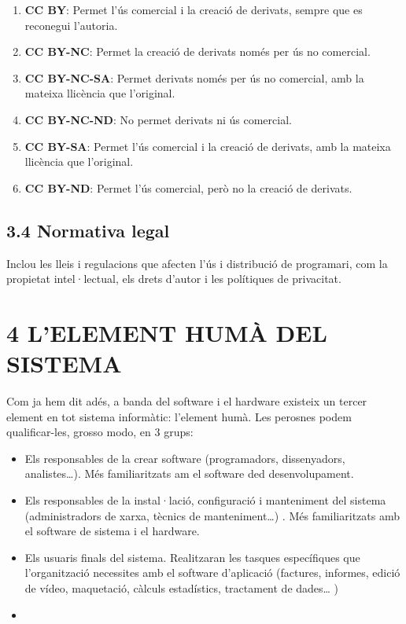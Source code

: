 \documentclass[
  12 pt,
  a4paper,
]{article}
\providecommand{\tightlist}{%
  \setlength{\itemsep}{0pt}\setlength{\parskip}{0pt}}
\begin{document}
\begin{enumerate}
\def\labelenumi{\arabic{enumi}.}
\tightlist
\item
  \textbf{CC BY}: Permet l'ús comercial i la creació de derivats, sempre
  que es reconegui l'autoria.
\item
  \textbf{CC BY-NC}: Permet la creació de derivats només per ús no
  comercial.
\item
  \textbf{CC BY-NC-SA}: Permet derivats només per ús no comercial, amb
  la mateixa llicència que l'original.
\item
  \textbf{CC BY-NC-ND}: No permet derivats ni ús comercial.
\item
  \textbf{CC BY-SA}: Permet l'ús comercial i la creació de derivats, amb
  la mateixa llicència que l'original.
\item
  \textbf{CC BY-ND}: Permet l'ús comercial, però no la creació de
  derivats.
\end{enumerate}

\subsection{3.4 Normativa legal}\label{normativa-legal}

Inclou les lleis i regulacions que afecten l'ús i distribució de
programari, com la propietat intel·lectual, els drets d'autor i les
polítiques de privacitat.

\section{4 L'ELEMENT HUMÀ DEL
SISTEMA}\label{lelement-humuxe0-del-sistema}

Com ja hem dit adés, a banda del software i el hardware existeix un
tercer element en tot sistema informàtic: l'element humà. Les perosnes
podem qualificar-les, grosso modo, en 3 grups:

\begin{itemize}
\item
  Els responsables de la crear software (programadors, dissenyadors,
  analistes\ldots). Més familiaritzats am el software ded
  desenvolupament.
\item
  Els responsables de la instal·lació, configuració i manteniment del
  sistema (administradors de xarxa, tècnics de manteniment\ldots) . Més
  familiaritzats amb el software de sistema i el hardware.
\item
  Els usuaris finals del sistema. Realitzaran les tasques específiques
  que l'organització necessites amb el software d'aplicació (factures,
  informes, edició de vídeo, maquetació, càlculs estadístics, tractament
  de dades\ldots{} )
\end{itemize}

\begin{itemize}
\tightlist
\item
\end{itemize}
\end{document}
